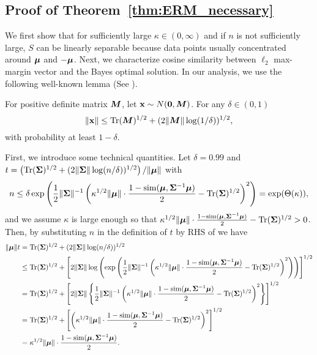 \subsection{Proof of Theorem~\ref{thm:ERM_necessary}}\label{proof:ERM_necessary}
We first show that for sufficiently large $\kappa \in (0, \infty)$ and if $n$ is not sufficiently large, 
$S$ can be linearly separable because data points usually concentrated around ${\bm{\mu}}$ and $-{\bm{\mu}}$. Next, we characterize cosine similarity between $\ell_2$ max-margin vector and the Bayes optimal solution. In our analysis, we use the following well-known lemma (See \citet{hanson1971bound,lugosi2019sub}).

\begin{lemma}\label{lemma:gaussian norm}
For positive definite matrix ${\bm{M}}$, let ${\mathbf{x}} \sim N({\bm{0}}, {\bm{M}})$. For any $\delta \in (0,1)$ 
\begin{equation*}
\lVert {\mathbf{x}} \rVert \leq  \operatorname{Tr}({\bm{M}})^{1/2} + (2 \lVert {\bm{M}} \rVert \log(1/\delta))^{1/2},
\end{equation*}
with probability at least $1-\delta$.
\end{lemma}
First, we introduce some technical quantities. Let $\delta = 0.99$ and $t = \left (\operatorname{Tr}( {\bm{\Sigma}})^{1/2} + (2 \lVert {\bm{\Sigma}} \rVert \log(n/\delta))^{1/2} \right )/\lVert {\bm{\mu}} \rVert$ with
\begin{equation}\label{eqn:ERM_nec}
    n \leq \delta \exp\left( \frac{1}{2} \lVert {\bm{\Sigma}} \rVert^{-1} \left( \kappa^{1/2}\lVert {\bm{\mu}} \rVert \cdot \frac{1- \mathrm{sim}({\bm{\mu}}, {\bm{\Sigma}}^{-1} {\bm{\mu}})}{2} - \operatorname{Tr}({\bm{\Sigma}})^{1/2}\right)^2 \right) = \exp(\Theta(\kappa)),
\end{equation}
and we assume $\kappa$ is large enough so that $\kappa^{1/2}\lVert {\bm{\mu}} \rVert \cdot \frac{1- \mathrm{sim}({\bm{\mu}}, {\bm{\Sigma}}^{-1} {\bm{\mu}})}{2} - \operatorname{Tr}({\bm{\Sigma}})^{1/2} >0$.
Then, by substituting $n$ in the definition of $t$ by RHS of  we have
\begin{align*}
\lVert {\bm{\mu}} \rVert t 
&= \operatorname{Tr}( {\bm{\Sigma}})^{1/2} + (2 \lVert {\bm{\Sigma}} \rVert \log(n/\delta))^{1/2}\\
&\leq \operatorname{Tr}( {\bm{\Sigma}})^{1/2} + \left[ 2 \lVert {\bm{\Sigma}} \rVert \log\left (\exp\left( \frac{1}{2} \lVert {\bm{\Sigma}} \rVert^{-1} \left( \kappa^{1/2}\lVert {\bm{\mu}} \rVert \cdot \frac{1- \mathrm{sim}({\bm{\mu}}, {\bm{\Sigma}}^{-1} {\bm{\mu}})}{2} - \operatorname{Tr}({\bm{\Sigma}})^{1/2}\right)^2 \right) \right) \right]^{1/2}\\
&= \operatorname{Tr}( {\bm{\Sigma}})^{1/2} + \left[ 2 \lVert {\bm{\Sigma}} \rVert \left\{ \frac{1}{2} \lVert {\bm{\Sigma}} \rVert^{-1} \left( \kappa^{1/2}\lVert {\bm{\mu}} \rVert \cdot \frac{1- \mathrm{sim}({\bm{\mu}}, {\bm{\Sigma}}^{-1} {\bm{\mu}})}{2} - \operatorname{Tr}({\bm{\Sigma}})^{1/2}\right)^2 \right\}  \right]^{1/2}\\
&= \operatorname{Tr}( {\bm{\Sigma}})^{1/2} + \left[ \left( \kappa^{1/2}\lVert {\bm{\mu}} \rVert \cdot \frac{1- \mathrm{sim}({\bm{\mu}}, {\bm{\Sigma}}^{-1} {\bm{\mu}})}{2} - \operatorname{Tr}({\bm{\Sigma}})^{1/2}\right)^2   \right]^{1/2}\\
&= \kappa^{1/2}\lVert {\bm{\mu}} \rVert \cdot\frac{1- \mathrm{sim}({\bm{\mu}}, {\bm{\Sigma}}^{-1} {\bm{\mu}})}{2}.
\end{align*}
